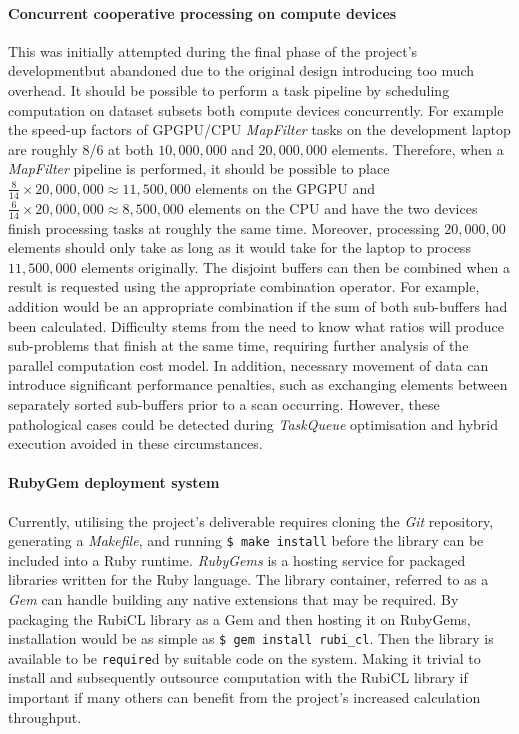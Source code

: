 \paragraph*{Concurrent cooperative processing on compute devices} This was initially attempted during the final phase of the project's developmentbut abandoned due to the original design introducing too much overhead. It should be possible to perform a task pipeline by scheduling computation on dataset subsets both compute devices concurrently. For example the speed-up factors of \ac{GPGPU}/\ac{CPU} \emph{MapFilter} tasks on the development laptop are roughly $8$/$6$ at both $10,000,000$ and $20,000,000$ elements. Therefore, when a \emph{MapFilter} pipeline is performed, it should be possible to place $\frac{8}{14} \times 20,000,000 \approx 11,500,000$ elements on the \ac{GPGPU} and $\frac{6}{14} \times 20,000,000 \approx 8,500,000$ elements on the \ac{CPU} and have the two devices finish processing tasks at roughly the same time. Moreover, processing $20,000,00$ elements should only take as long as it would take for the laptop to process $11,500,000$ elements originally. The disjoint buffers can then be combined when a result is requested using the appropriate combination operator. For example, addition would be an appropriate combination if the sum of both sub-buffers had been calculated. Difficulty stems from the need to know what ratios will produce sub-problems that finish at the same time, requiring further analysis of the parallel computation cost model. In addition, necessary movement of data can introduce significant performance penalties, such as exchanging elements between separately sorted sub-buffers prior to a scan occurring. However, these pathological cases could be detected during \emph{TaskQueue} optimisation and hybrid execution avoided in these circumstances.

\paragraph*{RubyGem deployment system}
Currently, utilising the project's deliverable requires cloning the \emph{Git} repository, generating a \emph{Makefile}, and running \verb|$ make install| before the library can be included into a Ruby runtime.
\emph{RubyGems}\cite{rubygems} is a hosting service for packaged libraries written for the Ruby language. The library container, referred to as a \emph{Gem} can handle building any native extensions that may be required.
By packaging the RubiCL library as a Gem and then hosting it on RubyGems, installation would be as simple as \verb|$ gem install rubi_cl|. Then the library is available to be \verb|require|d by suitable code on the system. Making it trivial to install and subsequently outsource computation with the RubiCL library if important if many others can benefit from the project's increased calculation throughput.
